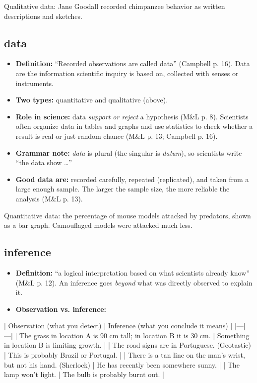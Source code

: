 \documentclass[11pt,letterpaper]{article}
\begin{document}
  {Qualitative data: Jane Goodall recorded chimpanzee behavior as written descriptions and sketches.}

\subsection{data}
\begin{itemize}
  \item \textbf{Definition:} ``Recorded observations are called data'' (Campbell p. 16). Data are the information scientific inquiry is based on, collected with senses or instruments.
  \item \textbf{Two types:} quantitative and qualitative (above).
  \item \textbf{Role in science:} data \emph{support or reject} a hypothesis (M\&L p. 8). Scientists often organize data in tables and graphs and use statistics to check whether a result is real or just random chance (M\&L p. 13; Campbell p. 16).
  \item \textbf{Grammar note:} \emph{data} is plural (the singular is \emph{datum}), so scientists write ``the data show \dots{}''
  \item \textbf{Good data are:} recorded carefully, repeated (replicated), and taken from a large enough sample. The larger the sample size, the more reliable the analysis (M\&L p. 13).
\end{itemize}

  {Quantitative data: the percentage of mouse models attacked by predators, shown as a bar graph. Camouflaged models were attacked much less.}

\subsection{inference}
\begin{itemize}
  \item \textbf{Definition:} ``a logical interpretation based on what scientists already know'' (M\&L p. 12). An inference goes \emph{beyond} what was directly observed to explain it.
  \item \textbf{Observation vs. inference:}
\end{itemize}

  | Observation (what you detect) | Inference (what you conclude it means) |   |---|---|   | The grass in location A is 90 cm tall; in location B it is 30 cm. | Something in location B is limiting growth. |   | The road signs are in Portuguese. (Geotastic) | This is probably Brazil or Portugal. |   | There is a tan line on the man's wrist, but not his hand. (Sherlock) | He has recently been somewhere sunny. |   | The lamp won't light. | The bulb is probably burnt out. |
\end{document}
